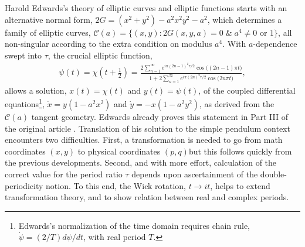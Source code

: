 \documentclass[nofootinbib,preprint]{revtex4-1}
\begin{document}
Harold Edwards's theory of elliptic curves and elliptic functions starts with an 
alternative normal form, $2G=(x^2+y^2)-a^2 x^2 y^2-a^2$, which determines a family
of elliptic curves, $\mathcal{C}(a)=\{(x,y):2G(x,y,a)=0 \;\&\; a^4 \neq 0 \text{ or } 1\}$, 
all non-singular according to the extra condition on modulus $a^4$. With $a$-dependence swept into 
$\tau$, the crucial elliptic function,
\begin{eqnarray}
\psi(t)= \chi(t+\tfrac{1}{2})= \frac{2\sum_{n=1}^{\infty}e^{i \pi(2n-1)^2 \tau/2}\cos\big((2 n-1)\pi t \big) 
}{1+2\sum_{n=1}^{\infty} e^{i \pi(2n)^2 \tau/2}\cos\big(2 n \pi t \big)},\nonumber
\end{eqnarray}
allows a solution, $x(t)=\chi(t)$ and $y(t)=\psi(t)$, of the coupled differential 
equations\footnote{Edwards's normalization of the time domain requires chain rule, 
$\dot{\psi}=(2/T) d\psi/dt  $, with real period $T$.}, ${\dot{x}=y(1-a^2 x^2)}$ and 
$\dot{y}=-x(1-a^2 y^2)$, as derived from the $\mathcal{C}(a)$ tangent geometry. 
Edwards already proves this statement in Part III of the original article \cite{EDWARDS2007}. 
Translation of his solution to the simple pendulum context encounters two difficulties. 
First, a  transformation is needed to go from math coordinates $(x,y)$ to physical coordinates 
$(p,q)$\textemdash but this follows quickly from the previous developments. Second,
and with more effort, calculation of the correct value for the period ratio $\tau$ 
depends upon ascertainment of the double-periodicity notion. To this end, the Wick rotation, 
$t \rightarrow i t$, helps to extend transformation theory,
and to show relation between real and complex periods. 
\end{document}
